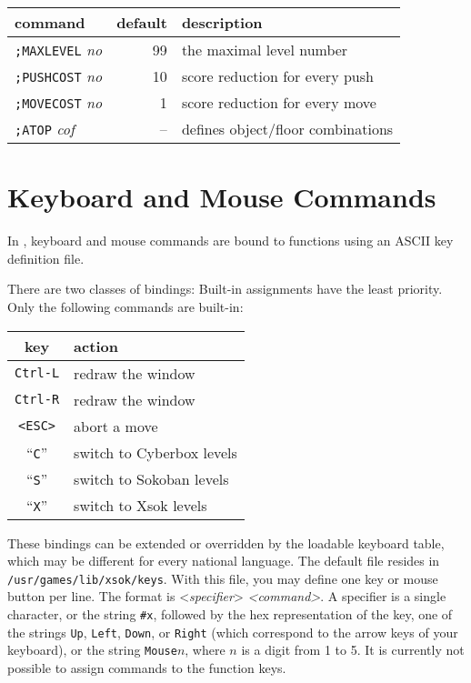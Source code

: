 \begin{center}
\begin{tabular}{|l|r|l|}
\hline
command & default & description\\
\hline
{\tt ;MAXLEVEL} {\em no} & 99 & the maximal level number\\
{\tt ;PUSHCOST} {\em no} & 10 & score reduction for every push\\
{\tt ;MOVECOST} {\em no} &  1 & score reduction for every move\\
{\tt ;ATOP} {\em cof} &  -- & defines object/floor combinations\\
\hline
\end{tabular}
\end{center}

\section{Keyboard and Mouse Commands}
In \xsok, keyboard and mouse commands are bound to functions using
an ASCII key definition file.

There are two classes of bindings:
Built-in assignments have the least priority. Only the following commands
are built-in:

\begin{center}
  \begin{tabular}{|c|l|}
    \hline
    key & action \\
    \hline
   {\tt Ctrl-L}& redraw the window\\
   {\tt Ctrl-R}& redraw the window\\
   {\tt <ESC>} & abort a move\\
   ``{\tt C}'' & switch to Cyberbox levels\\
   ``{\tt S}'' & switch to Sokoban levels\\
   ``{\tt X}'' & switch to Xsok levels\\
    \hline
  \end{tabular}
\end{center}

These bindings can be extended or overridden by the loadable keyboard table,
which may be different for every national language. The default file resides in
{\tt /usr/games/lib/xsok/keys}. With this file, you may define one key or mouse
button per line. The format is <{\em specifier\/}> {\em <command>\/}.  A
specifier is a single character, or the string {\tt \#x}, followed by the hex
representation of the key, one of the strings {\tt Up}, {\tt Left}, {\tt Down},
or {\tt Right} (which correspond to the arrow keys of your keyboard), or the
string {\tt Mouse}$n$, where $n$ is a digit from 1 to 5.
It is currently not possible to assign commands to the function keys.

